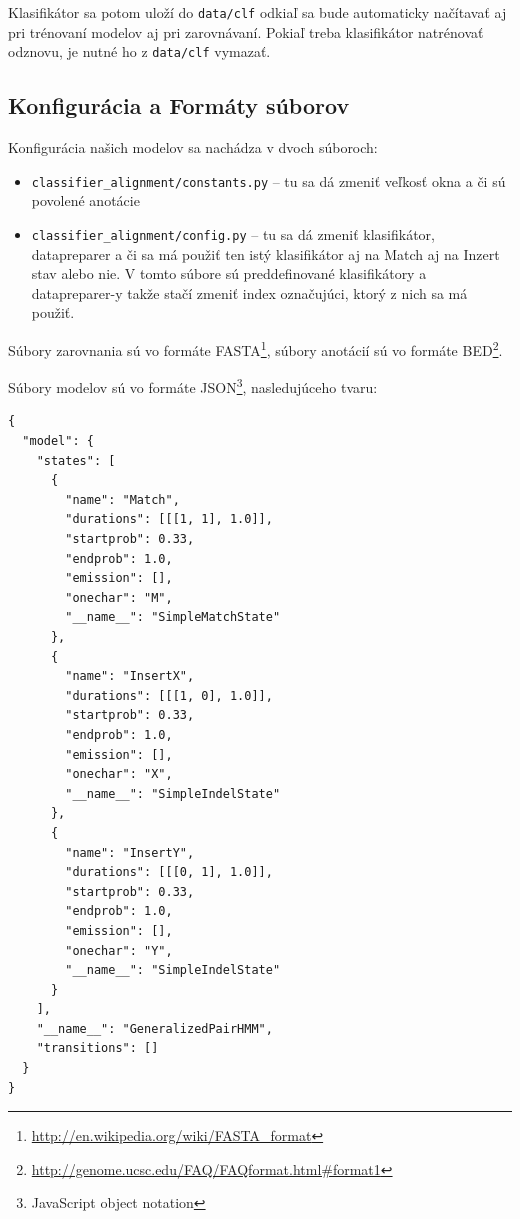 Klasifikátor sa potom uloží do {\tt data/clf} odkiaľ sa bude automaticky načítavať aj pri trénovaní modelov aj pri zarovnávaní. Pokiaľ treba klasifikátor natrénovať odznovu, je nutné ho z {\tt data/clf} vymazať.

\subsection{Konfigurácia a Formáty súborov}
Konfigurácia našich modelov sa nachádza v dvoch súboroch:
\begin{itemize}
    \item {\tt classifier\_alignment/constants.py} -- tu sa dá zmeniť veľkosť okna a či sú povolené anotácie
    \item {\tt classifier\_alignment/config.py} -- tu sa dá zmeniť klasifikátor, datapreparer a  či sa má použiť ten istý klasifikátor aj na Match aj na Inzert stav alebo nie. V tomto súbore sú preddefinované klasifikátory a datapreparer-y takže stačí zmeniť index označujúci, ktorý z nich sa má použiť.
\end{itemize}

Súbory zarovnania sú vo formáte FASTA\footnote{\url{http://en.wikipedia.org/wiki/FASTA_format}}, súbory anotácií sú vo formáte BED\footnote{\url{http://genome.ucsc.edu/FAQ/FAQformat.html\#format1}}.

Súbory modelov sú vo formáte JSON\footnote{JavaScript object notation}, nasledujúceho tvaru:

\begin{lstlisting}
{
  "model": {
    "states": [
      {
        "name": "Match",
        "durations": [[[1, 1], 1.0]],
        "startprob": 0.33,
        "endprob": 1.0,
        "emission": [],
        "onechar": "M",
        "__name__": "SimpleMatchState"
      },
      {
        "name": "InsertX",
        "durations": [[[1, 0], 1.0]],
        "startprob": 0.33,
        "endprob": 1.0,
        "emission": [],
        "onechar": "X",
        "__name__": "SimpleIndelState"
      },
      {
        "name": "InsertY",
        "durations": [[[0, 1], 1.0]],
        "startprob": 0.33,
        "endprob": 1.0,
        "emission": [],
        "onechar": "Y",
        "__name__": "SimpleIndelState"
      }
    ],
    "__name__": "GeneralizedPairHMM",
    "transitions": []
  }
}
\end{lstlisting}


